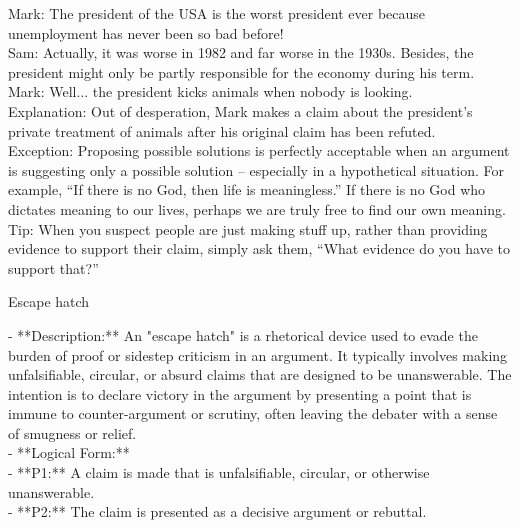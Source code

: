 \documentclass[a4paper,12pt,single,pdftex]{scrartcl}
\begin{document}
{    
      Mark: The president of the USA is the worst president ever because unemployment has never been so bad before!
    \\

    
      Sam: Actually, it was worse in 1982 and far worse in the 1930s.  Besides, the president might only be partly responsible for the economy during his term.
    \\

    
      Mark: Well... the president kicks animals when nobody is looking.
    \\

    
      Explanation: Out of desperation, Mark makes a claim about the president's private treatment of animals after his original claim has been refuted.
    \\

    
      Exception: Proposing possible solutions is perfectly acceptable when an argument is suggesting only a possible solution -- especially in a hypothetical situation. For example, “If there is no God, then life is meaningless.”  If there is no God who dictates meaning to our lives, perhaps we are truly free to find our own meaning.
    \\

    
      Tip: When you suspect people are just making stuff up, rather than providing evidence to support their claim, simply ask them, “What evidence do you have to support that?”
    \\

  }


Escape hatch
    
      - **Description:** An "escape hatch" is a rhetorical device used to evade the burden of proof or sidestep criticism in an argument. It typically involves making unfalsifiable, circular, or absurd claims that are designed to be unanswerable. The intention is to declare victory in the argument by presenting a point that is immune to counter-argument or scrutiny, often leaving the debater with a sense of smugness or relief.
    \\

    
      - **Logical Form:**
    \\

    
        - **P1:** A claim is made that is unfalsifiable, circular, or otherwise unanswerable.
    \\

    
        - **P2:** The claim is presented as a decisive argument or rebuttal.
    \\
\end{document}
